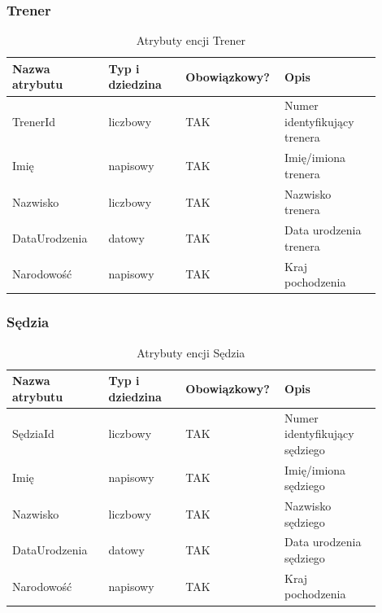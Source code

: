 \documentclass{mwrep}
\begin{document}
\newpage

\subsubsection{Trener}
\begin{table}[H]
	\begin{tabular}{|p{0.25\linewidth}|p{0.2\linewidth}|p{0.2\linewidth}|p{0.25\linewidth}|}
	\hline
	Nazwa atrybutu & Typ i dziedzina & Obowiązkowy? & Opis                                                           \\ \hline
	TrenerId   & liczbowy                            & TAK                              & Numer identyfikujący trenera                                                   \\ \hline
	Imię         & napisowy                           & TAK                              & Imię/imiona trenera        \\ \hline
	Nazwisko	   & liczbowy							& TAK								& Nazwisko trenera \\  \hline
	DataUrodzenia          & datowy                           & TAK                              & Data urodzenia trenera              \\ \hline
	Narodowość           & napisowy                            & TAK                              & Kraj pochodzenia   \\ \hline
	\end{tabular}
	\caption{Atrybuty encji Trener}
\end{table}

\vspace{1cm}

\subsubsection{Sędzia}
\begin{table}[H]
	\begin{tabular}{|p{0.25\linewidth}|p{0.2\linewidth}|p{0.2\linewidth}|p{0.25\linewidth}|}
	\hline
	Nazwa atrybutu & Typ i dziedzina & Obowiązkowy? & Opis                                                           \\ \hline
	SędziaId   & liczbowy                            & TAK                              & Numer identyfikujący sędziego                                                   \\ \hline
	Imię         & napisowy                           & TAK                              & Imię/imiona sędziego        \\ \hline
	Nazwisko	   & liczbowy							& TAK								& Nazwisko sędziego \\  \hline
	DataUrodzenia          & datowy                           & TAK                              & Data urodzenia sędziego              \\ \hline
	Narodowość           & napisowy                            & TAK                              & Kraj pochodzenia   \\ \hline
	\end{tabular}
	\caption{Atrybuty encji Sędzia}
\end{table}
\end{document}
